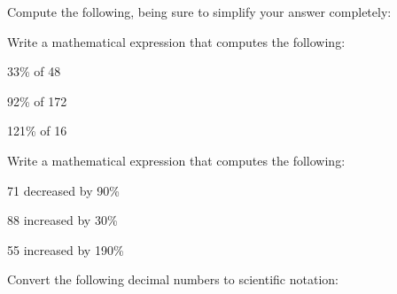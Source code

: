 \documentclass[12pt,letterpaper]{exam}
\begin{document}
\begin{questions}
\newpage



\question[8] Compute the following, being sure to simplify your answer completely: \pspace
{}



\newpage



\question[6] Write a mathematical expression that computes the following: \pspace
\begin{parts}
\item 33\% of 48 \vfill
\item 92\% of 172 \vfill
\item 121\% of 16 \vfill
\end{parts} \vfill



\question[6] Write a mathematical expression that computes the following: \pspace
\begin{parts}
\item 71 decreased by 90\% \vfill
\item 88 increased by 30\% \vfill
\item 55 increased by 190\% \vfill
\end{parts}



\newpage



\question[4] Convert the following decimal numbers to scientific notation: \pspace
{}
\end{questions}
\end{document}
